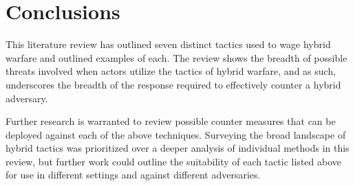 \section{Conclusions}

This literature review has outlined seven distinct tactics used to wage hybrid
warfare and outlined examples of each. The review shows the breadth of possible
threats involved when actors utilize the tactics of hybrid warfare, and as such,
underscores the breadth of the response required to effectively counter a hybrid
adversary.

Further research is warranted to review possible counter measures that can be
deployed against each of the above techniques. Surveying the broad landscape of
hybrid tactics was prioritized over a deeper analysis of individual methods in
this review, but further work could outline the suitability of each tactic
listed above for use in different settings and against different adversaries.

